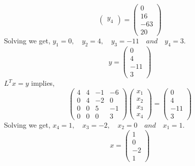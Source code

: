 \documentclass[a4paper, 12pt]{report}
\begin{document}
{\begin{equation*}
\begin{pmatrix}
	y_4
\end{pmatrix}
=
\begin{pmatrix}
0\\
16\\
-63\\
20
\end{pmatrix}
\end{equation*}
Solving we get, $y_1 = 0, \quad y_2 = 4, \quad y_3 = -11 \quad and \quad y_4 = 3.$
\begin{equation*} y =
\begin{pmatrix}
0\\
4\\
-11\\
3
\end{pmatrix}
\end{equation*}
$L^Tx = y$ implies,
 \begin{equation*}
 \begin{pmatrix}
 4 & 4 & -1 & -6\\
 0 & 4 & -2 & 0\\
 0 & 0 & 5 & -1\\
 0 & 0 & 0 & 3
 \end{pmatrix}
 \begin{pmatrix}
 x_1\\
 x_2\\
 x_3\\
 x_4
 \end{pmatrix}
 =    
 \begin{pmatrix}
 0\\
 4\\
 -11\\
 3
 \end{pmatrix}
\end{equation*} 
Solving we get, $x_4 = 1, \quad x_3 = -2, \quad x_2 = 0 \quad and \quad x_1 = 1.$
 \begin{equation*} x =
 \begin{pmatrix}
 1\\
 0\\
 -2\\
 1
 \end{pmatrix}
 \end{equation*}\\
 

}
\end{document}
